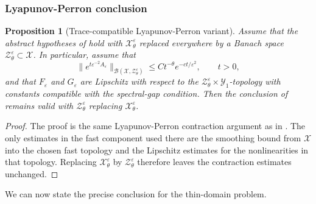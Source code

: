 \documentclass[11pt]{article}
\newtheorem{proposition}[theorem]{Proposition}
\theoremstyle{definition}
\theoremstyle{remark}
\numberwithin{equation}{section}
\newcommand{\mc}[1]{\mathcal{#1}}
\begin{document}
\subsubsection*{Lyapunov-Perron conclusion}
\label{subsubsec:thin-domain-LP-conclusion}

\begin{proposition}[Trace-compatible Lyapunov-Perron variant]
\label{prop:trace-compatible-LP-replacement}
Assume that the abstract hypotheses of  hold with
\(\mc X_\theta^\varepsilon\) replaced everywhere by a Banach space
\(\mc Z_\theta^\varepsilon\subset\mc X\). In particular, assume that
\[
\|e^{t\varepsilon^{-2}A_\varepsilon}\|_{\mathcal B(\mc X,\mc Z_\theta^\varepsilon)}
\le
C t^{-\theta}e^{-ct/\varepsilon^2},
\qquad t>0,
\]
and that \(F_\varepsilon\) and \(G_\varepsilon\) are Lipschitz with respect to
the \(\mc Z_\theta^\varepsilon\times\mc Y_1\)-topology with constants compatible
with the spectral-gap condition. Then the conclusion of
 remains valid with
\(\mc Z_\theta^\varepsilon\) replacing \(\mc X_\theta^\varepsilon\).
\end{proposition}

\begin{proof}
The proof is the same Lyapunov-Perron contraction argument as in
. The only estimates in the fast component used
there are the smoothing bound from \(\mc X\) into the chosen fast topology and
the Lipschitz estimates for the nonlinearities in that topology. Replacing
\(\mc X_\theta^\varepsilon\) by \(\mc Z_\theta^\varepsilon\) therefore leaves the
contraction estimates unchanged.
\end{proof}

We can now state the precise conclusion for the thin-domain problem.
\end{document}
